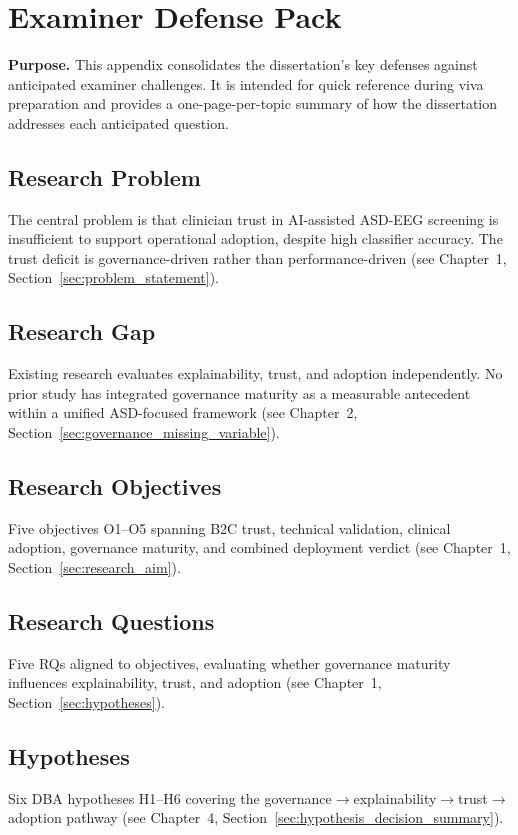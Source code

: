 \chapter{Examiner Defense Pack}
\label{app:examiner_defense_pack}

\noindent\textbf{Purpose.} This appendix consolidates the dissertation's key defenses against anticipated examiner challenges. It is intended for quick reference during viva preparation and provides a one-page-per-topic summary of how the dissertation addresses each anticipated question.

\section{Research Problem}
The central problem is that clinician trust in AI-assisted ASD-EEG screening is insufficient to support operational adoption, despite high classifier accuracy. The trust deficit is governance-driven rather than performance-driven (see Chapter~1, Section~\ref{sec:problem_statement}).

\section{Research Gap}
Existing research evaluates explainability, trust, and adoption independently. No prior study has integrated governance maturity as a measurable antecedent within a unified ASD-focused framework (see Chapter~2, Section~\ref{sec:governance_missing_variable}).

\section{Research Objectives}
Five objectives O1--O5 spanning B2C trust, technical validation, clinical adoption, governance maturity, and combined deployment verdict (see Chapter~1, Section~\ref{sec:research_aim}).

\section{Research Questions}
Five RQs aligned to objectives, evaluating whether governance maturity influences explainability, trust, and adoption (see Chapter~1, Section~\ref{sec:hypotheses}).

\section{Hypotheses}
Six DBA hypotheses H1--H6 covering the governance$\rightarrow$explainability$\rightarrow$trust$\rightarrow$adoption pathway (see Chapter~4, Section~\ref{sec:hypothesis_decision_summary}).

